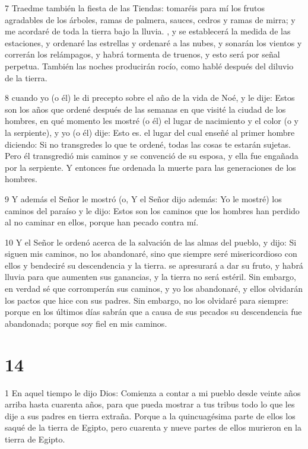 \par 7 Traedme también la fiesta de las Tiendas: tomaréis para mí los frutos agradables de los árboles, ramas de palmera, sauces, cedros y ramas de mirra; y me acordaré de toda la tierra bajo la lluvia. , y se establecerá la medida de las estaciones, y ordenaré las estrellas y ordenaré a las nubes, y sonarán los vientos y correrán los relámpagos, y habrá tormenta de truenos, y esto será por señal perpetua. También las noches producirán rocío, como hablé después del diluvio de la tierra.

\par 8 cuando yo (o él) le di precepto sobre el año de la vida de Noé, y le dije: Estos son los años que ordené después de las semanas en que visité la ciudad de los hombres, en qué momento les mostré (o él) el lugar de nacimiento y el color (o y la serpiente), y yo (o él) dije: Esto es. el lugar del cual enseñé al primer hombre diciendo: Si no transgredes lo que te ordené, todas las cosas te estarán sujetas. Pero él transgredió mis caminos y se convenció de su esposa, y ella fue engañada por la serpiente. Y entonces fue ordenada la muerte para las generaciones de los hombres.

\par 9 Y además el Señor le mostró (o, Y el Señor dijo además: Yo le mostré) los caminos del paraíso y le dijo: Estos son los caminos que los hombres han perdido al no caminar en ellos, porque han pecado contra mí.

\par 10 Y el Señor le ordenó acerca de la salvación de las almas del pueblo, y dijo: Si siguen mis caminos, no los abandonaré, sino que siempre seré misericordioso con ellos y bendeciré su descendencia y la tierra. se apresurará a dar su fruto, y habrá lluvia para que aumenten sus ganancias, y la tierra no será estéril. Sin embargo, en verdad sé que corromperán sus caminos, y yo los abandonaré, y ellos olvidarán los pactos que hice con sus padres. Sin embargo, no los olvidaré para siempre: porque en los últimos días sabrán que a causa de sus pecados su descendencia fue abandonada; porque soy fiel en mis caminos.

\chapter{14}

\par 1 En aquel tiempo le dijo Dios: Comienza a contar a mi pueblo desde veinte años arriba hasta cuarenta años, para que pueda mostrar a tus tribus todo lo que les dije a sus padres en tierra extraña. Porque a la quincuagésima parte de ellos los saqué de la tierra de Egipto, pero cuarenta y nueve partes de ellos murieron en la tierra de Egipto.

